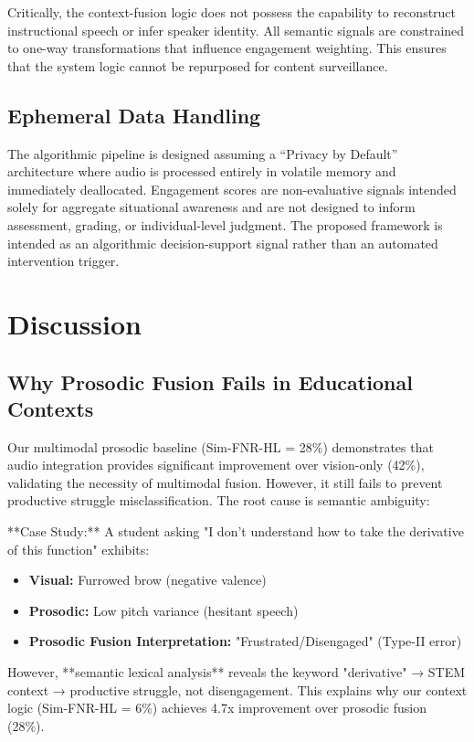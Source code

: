 \documentclass[conference]{IEEEtran}
\begin{document}
Critically, the context-fusion logic does not possess the capability to reconstruct instructional speech or infer speaker identity. All semantic signals are constrained to one-way transformations that influence engagement weighting. This ensures that the system logic cannot be repurposed for content surveillance.

\subsection{Ephemeral Data Handling}
The algorithmic pipeline is designed assuming a ``Privacy by Default'' architecture where audio is processed entirely in volatile memory and immediately deallocated. Engagement scores are non-evaluative signals intended solely for aggregate situational awareness and are not designed to inform assessment, grading, or individual-level judgment. The proposed framework is intended as an algorithmic decision-support signal rather than an automated intervention trigger.

\section{Discussion}

\subsection{Why Prosodic Fusion Fails in Educational Contexts}
Our multimodal prosodic baseline (Sim-FNR-HL = 28\%) demonstrates that audio integration provides significant improvement over vision-only (42\%), validating the necessity of multimodal fusion. However, it still fails to prevent productive struggle misclassification. The root cause is semantic ambiguity:

**Case Study:** A student asking "I don't understand how to take the derivative of this function" exhibits:
\begin{itemize}
    \item \textbf{Visual:} Furrowed brow (negative valence)
    \item \textbf{Prosodic:} Low pitch variance (hesitant speech)
    \item \textbf{Prosodic Fusion Interpretation:} "Frustrated/Disengaged" (Type-II error)
\end{itemize}

However, **semantic lexical analysis** reveals the keyword "derivative" → STEM context → productive struggle, not disengagement. This explains why our context logic (Sim-FNR-HL = 6\%) achieves 4.7x improvement over prosodic fusion (28\%).
\end{document}
